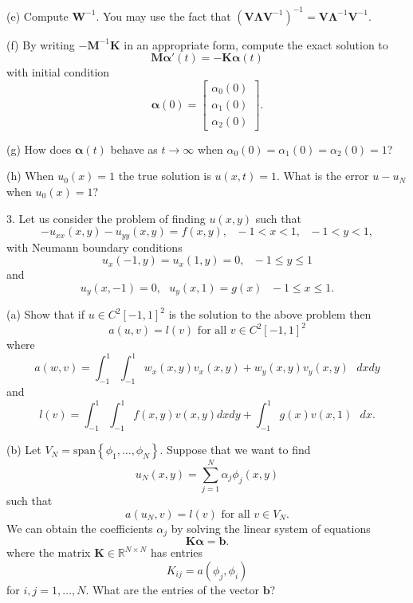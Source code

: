 \documentclass[11pt,twoside,reqno,a4paper]{amsart}
\begin{document}
(e) Compute $\boldsymbol{W}^{-1}$. You may use the fact that $\left(\boldsymbol{V}\boldsymbol{\Lambda}\boldsymbol{V}^{-1}\right)^{-1}=\boldsymbol{V}\boldsymbol{\Lambda}^{-1}\boldsymbol{V}^{-1}$.

(f) By writing $-\boldsymbol{M}^{-1}\boldsymbol{K}$ in an appropriate form, compute the exact solution to
\[
\boldsymbol{M}\boldsymbol{\alpha}'\left(t\right)=-\boldsymbol{K}\boldsymbol{\alpha}\left(t\right)
\]
with initial condition
\[
\boldsymbol{\alpha}\left(0\right)=\left[\begin{array}{c}\alpha_0\left(0\right) \\ \alpha_1\left(0\right) \\ \alpha_2\left(0\right)\end{array}\right].
\]

(g) How does $\boldsymbol{\alpha}\left(t\right)$ behave as $t\rightarrow\infty$ when $\alpha_0\left(0\right)=\alpha_1\left(0\right)=\alpha_2\left(0\right)=1$?

(h) When $u_0\left(x\right)=1$ the true solution is $u\left(x,t\right)=1$. What is the error $u-u_N$ when $u_0\left(x\right)=1$?



\bigskip



3. Let us consider the problem of finding $u\left(x,y\right)$ such that
\[
-u_{xx}\left(x,y\right)-u_{yy}\left(x,y\right)=f\left(x,y\right),\mbox{ }-1<x<1,\mbox{ }-1<y<1,
\]
with Neumann boundary conditions
\[
u_x\left(-1,y\right)=u_x\left(1,y\right)=0,\mbox{ }-1\le y\le1
\]
and 
\[
u_y\left(x,-1\right)=0,\mbox{ }u_y\left(x,1\right)=g\left(x\right)\mbox{ }-1\le x\le1.
\]

(a) Show that if $u\in C^2\left[-1,1\right]^2$ is the solution to the above problem then
\[
a\left(u,v\right)=l\left(v\right)\mbox{ for all }v\in C^2\left[-1,1\right]^2
\]
where
\[
a\left(w,v\right)=\int_{-1}^1\int_{-1}^1w_x\left(x,y\right)v_x\left(x,y\right)+w_y\left(x,y\right)v_y\left(x,y\right)\mbox{ }dxdy
\]
and
\[
l\left(v\right)=\int_{-1}^1\int_{-1}^1f\left(x,y\right)v\left(x,y\right)dxdy+\int_{-1}^1g\left(x\right)v\left(x,1\right)\mbox{ }dx.
\]

(b) Let $V_N=\mbox{span}\left\{\phi_1,\ldots,\phi_N\right\}$. Suppose that we want to find
\[
u_N\left(x,y\right)=\sum_{j=1}^N\alpha_j\phi_j\left(x,y\right)
\]
such that
\[
a\left(u_N,v\right)=l\left(v\right)\mbox{ for all }v\in V_N.
\]
We can obtain the coefficients $\alpha_j$ by solving the linear system of equations
\[
\boldsymbol{K}\boldsymbol{\alpha}=\boldsymbol{b}.
\]
where the matrix $\boldsymbol{K}\in\mathbb{R}^{N\times N}$ has entries
\[
K_{ij}=a\left(\phi_j,\phi_i\right)
\]
for $i,j=1,\ldots,N$. What are the entries of the vector $\boldsymbol{b}$?
\end{document}
